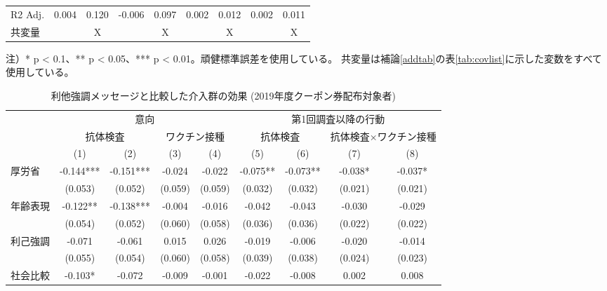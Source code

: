 \documentclass[
  11pt,
  a4paper,
]{article}
\begin{document}
\begin{table}
\begin{threeparttable}
\begin{tabular}[t]{lcccccccc}
R2 Adj. & 0.004 & 0.120 & -0.006 & 0.097 & 0.002 & 0.012 & 0.002 & 0.011\\
共変量 &  & X &  & X &  & X &  & X\\
\bottomrule
\end{tabular}
\begin{tablenotes}
\item 注）* p < 0.1、** p < 0.05、*** p < 0.01。頑健標準誤差を使用している。 共変量は補論\ref{addtab}の表\ref{tab:covlist}に示した変数をすべて使用している。
\end{tablenotes}
\end{threeparttable}
\end{table}

\begin{table}

\caption{\label{tab:altbase-reg-coupon1}利他強調メッセージと比較した介入群の効果 (2019年度クーポン券配布対象者)}
\centering
\fontsize{9}{11}\selectfont
\begin{threeparttable}
\begin{tabular}[t]{lcccccccc}
\toprule
\multicolumn{1}{c}{ } & \multicolumn{4}{c}{意向} & \multicolumn{4}{c}{第1回調査以降の行動} \\
\cmidrule(l{3pt}r{3pt}){2-5} \cmidrule(l{3pt}r{3pt}){6-9}
\multicolumn{1}{c}{ } & \multicolumn{2}{c}{抗体検査} & \multicolumn{2}{c}{ワクチン接種} & \multicolumn{2}{c}{抗体検査} & \multicolumn{2}{c}{抗体検査×ワクチン接種} \\
\cmidrule(l{3pt}r{3pt}){2-3} \cmidrule(l{3pt}r{3pt}){4-5} \cmidrule(l{3pt}r{3pt}){6-7} \cmidrule(l{3pt}r{3pt}){8-9}
  & (1) & (2) & (3) & (4) & (5) & (6) & (7) & (8)\\
\midrule
厚労省 & -0.144*** & -0.151*** & -0.024 & -0.022 & -0.075** & -0.073** & -0.038* & -0.037*\\
 & (0.053) & (0.052) & (0.059) & (0.059) & (0.032) & (0.032) & (0.021) & (0.021)\\
年齢表現 & -0.122** & -0.138*** & -0.004 & -0.016 & -0.042 & -0.043 & -0.030 & -0.029\\
 & (0.054) & (0.052) & (0.060) & (0.058) & (0.036) & (0.036) & (0.022) & (0.022)\\
利己強調 & -0.071 & -0.061 & 0.015 & 0.026 & -0.019 & -0.006 & -0.020 & -0.014\\
 & (0.055) & (0.054) & (0.060) & (0.058) & (0.039) & (0.038) & (0.024) & (0.023)\\
社会比較 & -0.103* & -0.072 & -0.009 & -0.001 & -0.022 & -0.008 & 0.002 & 0.008\\

\end{tabular}
\end{threeparttable}
\end{table}
\end{document}
